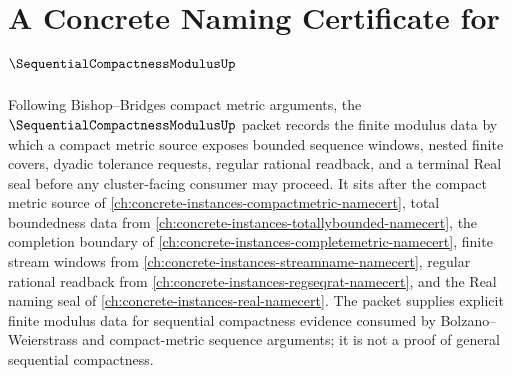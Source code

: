 \chapter{A Concrete Naming Certificate for $\SequentialCompactnessModulusUp$}
\label{ch:concrete-instances-sequential-compactness-modulus-namecert}

Following Bishop--Bridges compact metric arguments, the $\SequentialCompactnessModulusUp$ packet records the finite modulus data by which a compact metric source exposes bounded sequence windows, nested finite covers, dyadic tolerance requests, regular rational readback, and a terminal Real seal before any cluster-facing consumer may proceed. It sits after the compact metric source of \autoref{ch:concrete-instances-compactmetric-namecert}, total boundedness data from \autoref{ch:concrete-instances-totallybounded-namecert}, the completion boundary of \autoref{ch:concrete-instances-completemetric-namecert}, finite stream windows from \autoref{ch:concrete-instances-streamname-namecert}, regular rational readback from \autoref{ch:concrete-instances-regseqrat-namecert}, and the Real naming seal of \autoref{ch:concrete-instances-real-namecert}. The packet supplies explicit finite modulus data for sequential compactness evidence consumed by Bolzano--Weierstrass and compact-metric sequence arguments; it is not a proof of general sequential compactness.


